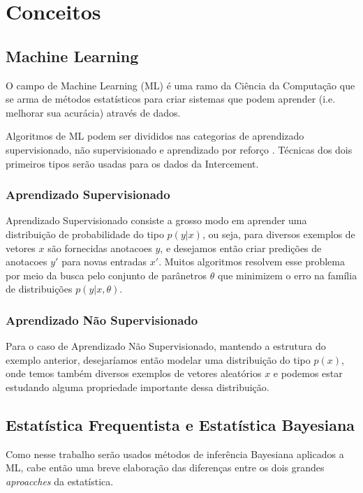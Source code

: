 \chapter{Conceitos}
\label{cap:conceitos}


\section{Machine Learning}

O campo de Machine Learning (ML) é uma ramo da Ciência da Computação que se arma de métodos estatísticos para criar sistemas que podem aprender (i.e. melhorar sua acurácia) através de dados.

Algoritmos de ML podem ser divididos nas categorias de aprendizado supervisionado, não supervisionado e aprendizado por reforço \citep{dlbook}. Técnicas dos dois primeiros tipos serão usadas para os dados da Intercement.

\subsection{Aprendizado Supervisionado}

Aprendizado Supervisionado consiste a grosso modo em aprender uma distribuição de probabilidade do tipo $p(y | x)$, ou seja, para diversos exemplos de vetores $x$ são fornecidas anotacoes $y$, e desejamos então criar predições de anotacoes $y'$ para novas entradas $x'$. Muitos algoritmos resolvem esse problema por meio da busca pelo conjunto de parânetros $\theta$ que minimizem o erro na família de distribuições $p(y | x,\theta)$.

\subsection{Aprendizado Não Supervisionado}

Para o caso de Aprendizado Não Supervisionado, mantendo a estrutura do exemplo anterior, desejaríamos então modelar uma distribuição do tipo $p(x)$, onde temos também diversos exemplos de vetores aleatórios $x$ e podemos estar estudando alguma propriedade importante dessa distribuição.

\section{Estatística Frequentista e Estatística Bayesiana}

Como nesse trabalho serão usados métodos de inferência Bayesiana aplicados a ML, cabe então uma breve elaboração das diferenças entre os dois grandes \textit{aproacches} da estatística.\\

